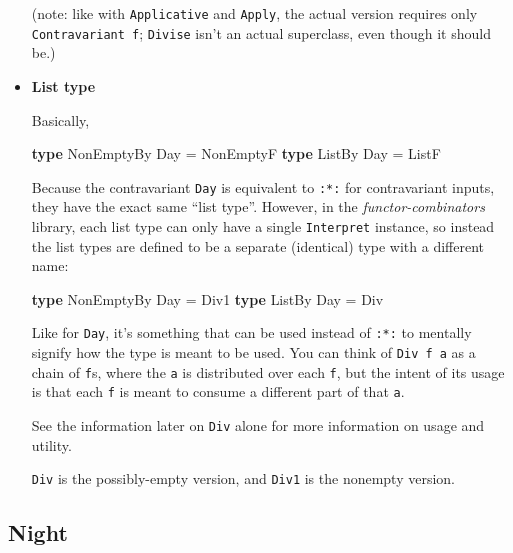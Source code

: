 \documentclass[]{article}
\newenvironment{Shaded}{}{}
\newcommand{\DataTypeTok}[1]{\textcolor[rgb]{0.56,0.13,0.00}{#1}}
\newcommand{\KeywordTok}[1]{\textcolor[rgb]{0.00,0.44,0.13}{\textbf{#1}}}
\newcommand{\OtherTok}[1]{\textcolor[rgb]{0.00,0.44,0.13}{#1}}
\begin{document}
\begin{itemize}
  (note: like with \texttt{Applicative} and \texttt{Apply}, the actual version
  requires only \texttt{Contravariant\ f}; \texttt{Divise} isn't an actual
  superclass, even though it should be.)
\item
  \textbf{List type}

  Basically,

\begin{Shaded}
\begin{Highlighting}[]
\KeywordTok{type} \DataTypeTok{NonEmptyBy} \DataTypeTok{Day} \OtherTok{=} \DataTypeTok{NonEmptyF}
\KeywordTok{type} \DataTypeTok{ListBy}     \DataTypeTok{Day} \OtherTok{=} \DataTypeTok{ListF}
\end{Highlighting}
\end{Shaded}

  Because the contravariant \texttt{Day} is equivalent to \texttt{:*:} for
  contravariant inputs, they have the exact same ``list type''. However, in the
  \emph{functor-combinators} library, each list type can only have a single
  \texttt{Interpret} instance, so instead the list types are defined to be a
  separate (identical) type with a different name:

\begin{Shaded}
\begin{Highlighting}[]
\KeywordTok{type} \DataTypeTok{NonEmptyBy} \DataTypeTok{Day} \OtherTok{=} \DataTypeTok{Div1}
\KeywordTok{type} \DataTypeTok{ListBy}     \DataTypeTok{Day} \OtherTok{=} \DataTypeTok{Div}
\end{Highlighting}
\end{Shaded}

  Like for \texttt{Day}, it's something that can be used instead of \texttt{:*:}
  to mentally signify how the type is meant to be used. You can think of
  \texttt{Div\ f\ a} as a chain of \texttt{f}s, where the \texttt{a} is
  distributed over each \texttt{f}, but the intent of its usage is that each
  \texttt{f} is meant to consume a different part of that \texttt{a}.

  See the information later on \texttt{Div} alone for more information on usage
  and utility.

  \texttt{Div} is the possibly-empty version, and \texttt{Div1} is the nonempty
  version.
\end{itemize}

\hypertarget{night}{%
\subsection{Night}\label{night}}
\end{document}
